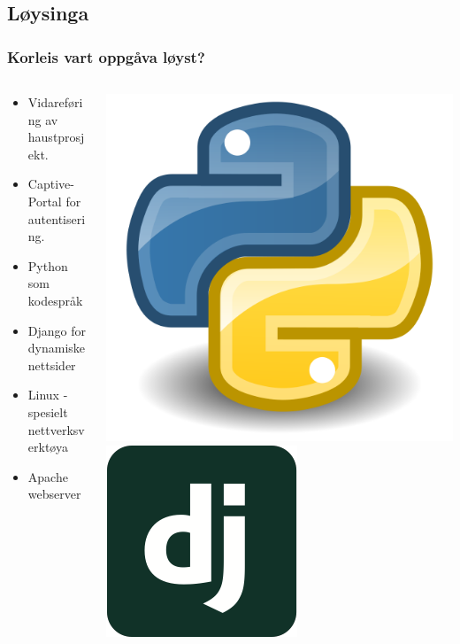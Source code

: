 \documentclass[nynorsk,14pt]{beamer}
\begin{document}
\subsection{Løysinga}
\begin{frame} %
	\frametitle{Korleis vart oppgåva løyst?}
	\begin{columns}[t]
	\begin{column}[T]{8cm}
		\begin{itemize}
			\item Vidareføring av haustprosjekt.
			\item Captive-Portal for autentisering.
			\item Python som kodespråk
			\item Django for dynamiske nettsider
			\item Linux - spesielt nettverksverktøya
			\item Apache webserver 
		\end{itemize}
	\end{column}
	\begin{column}[T]{4cm}
	\begin{flushright}
		\includegraphics[scale=0.06]{imgs/python.png} \\
		\includegraphics[scale=0.2]{imgs/django_logo.png} \\

\end{flushright}
\end{column}
\end{columns}
\end{frame}
\end{document}
